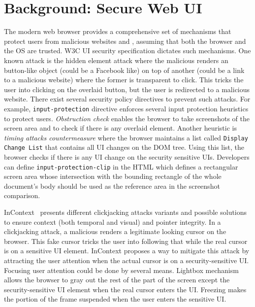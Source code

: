 \section{Background: Secure Web UI}
\label{sec:background}

The modern web browser provides a comprehensive set of mechanisms that protect users from malicious websites and \js, assuming that both the browser and the OS are trusted. W3C UI security specification \cite{w3c_spec} dictates such mechanisms. One known attack is the hidden element attack where the malicious \js renders an button-like object (could be a Facebook like) on top of another (could be a link to a malicious website) where the former is transparent to click. This tricks the user into clicking on the overlaid button, but the user is redirected to a malicious website. There exist several security policy directives to prevent such attacks. For example, \texttt{input-protection} directive enforces several input protection heuristics to protect users. \emph{Obstruction check} enables the browser to take screenshots of the screen area and to check if there is any overlaid element. Another heuristic is \emph{timing attacks countermeasure} where the browser maintains a list called \texttt{Display Change List} that contains all UI changes on the DOM tree. Using this list, the browser checks if there is any UI change on the security sensitive UIs. Developers can define \texttt{input-protection-clip} in the HTML which defines a rectangular screen area whose intersection with the bounding rectangle of the whole document's body should be used as the reference area in the screenshot comparison.

InContext~\cite{huang2012clickjacking} presents different clickjacking attacks variants and possible solutions to ensure context (both temporal and visual) and pointer integrity. In a clickjacking attack, a malicious \js renders a legitimate looking cursor on the browser. This fake cursor tricks the user into following that while the real cursor is on a sensitive UI element. InContext proposes a way to mitigate this attack by attracting the user attention when the actual cursor is on a security-sensitive UI. Focusing user attention could be done by several means. Lightbox mechanism allows the browser to gray out the rest of the part of the screen except the security-sensitive UI element when the real cursor enters the UI. Freezing makes the portion of the frame suspended when the user enters the sensitive UI. %